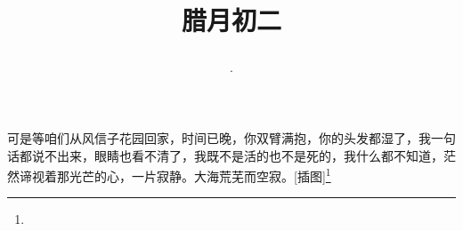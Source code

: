 \title{\date[d=12,m=1,y=2024][year:cn-y,年,month:cn,day:cn,日,·,weekday]·腊月初二 }
可是等咱们从风信子花园回家，时间已晚，你双臂满抱，你的头发都湿了，我一句话都说不出来，眼睛也看不清了，我既不是活的也不是死的，我什么都不知道，茫然谛视着那光芒的心，一片寂静。大海荒芜而空寂。[插图]\footnote{ }

